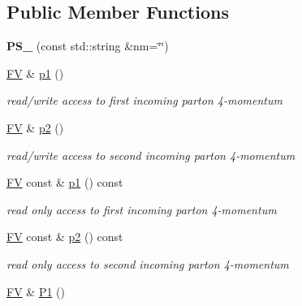 \subsection*{Public Member Functions}
\begin{DoxyCompactItemize}
\item 
\hypertarget{classPS__2_ae359831d133d3a4830c3600fa8d32c06}{{\bfseries P\-S\-\_} (const std\-::string \&nm=\char`\"{}\char`\"{})}\label{classPS__2_ae359831d133d3a4830c3600fa8d32c06}

\item 
\hypertarget{classPS__2_a8d77fbe890b80085027ac929c85cca18}{\hyperlink{classFV}{F\-V} \& \hyperlink{classPS__2_a8d77fbe890b80085027ac929c85cca18}{p1} ()}\label{classPS__2_a8d77fbe890b80085027ac929c85cca18}

\begin{DoxyCompactList}\small\item\em read/write access to first incoming parton 4-\/momentum \end{DoxyCompactList}\item 
\hypertarget{classPS__2_a51fe8ffc84f4527f5da4530269bc3434}{\hyperlink{classFV}{F\-V} \& \hyperlink{classPS__2_a51fe8ffc84f4527f5da4530269bc3434}{p2} ()}\label{classPS__2_a51fe8ffc84f4527f5da4530269bc3434}

\begin{DoxyCompactList}\small\item\em read/write access to second incoming parton 4-\/momentum \end{DoxyCompactList}\item 
\hypertarget{classPS__2_a999fae525d845b24359f69c99d3f5f67}{\hyperlink{classFV}{F\-V} const \& \hyperlink{classPS__2_a999fae525d845b24359f69c99d3f5f67}{p1} () const }\label{classPS__2_a999fae525d845b24359f69c99d3f5f67}

\begin{DoxyCompactList}\small\item\em read only access to first incoming parton 4-\/momentum \end{DoxyCompactList}\item 
\hypertarget{classPS__2_a144b72cd5af27d3cee36a2d6d88bbb1b}{\hyperlink{classFV}{F\-V} const \& \hyperlink{classPS__2_a144b72cd5af27d3cee36a2d6d88bbb1b}{p2} () const }\label{classPS__2_a144b72cd5af27d3cee36a2d6d88bbb1b}

\begin{DoxyCompactList}\small\item\em read only access to second incoming parton 4-\/momentum \end{DoxyCompactList}\item 
\hypertarget{classPS__2_a44e3773e7808eff87c2db0d1a2244477}{\hyperlink{classFV}{F\-V} \& \hyperlink{classPS__2_a44e3773e7808eff87c2db0d1a2244477}{P1} ()}\label{classPS__2_a44e3773e7808eff87c2db0d1a2244477}


\end{DoxyCompactItemize}

